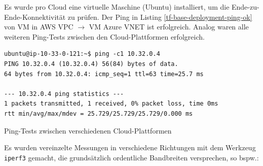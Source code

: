 Es wurde pro Cloud eine virtuelle Maschine (Ubuntu) installiert, um die Ende-zu-Ende-Konnektivität zu prüfen. Der Ping in Listing \ref{tf-base-deployment-ping-ok} von VM in AWS VPC $\rightarrow$ VM Azure VNET ist erfolgreich. Analog waren alle weiteren Ping-Tests zwischen den Cloud-Plattformen erfolgreich.
\begin{listing}[h]
\begin{verbatim}
ubuntu@ip-10-33-0-121:~$ ping -c1 10.32.0.4
PING 10.32.0.4 (10.32.0.4) 56(84) bytes of data.
64 bytes from 10.32.0.4: icmp_seq=1 ttl=63 time=25.7 ms

--- 10.32.0.4 ping statistics ---
1 packets transmitted, 1 received, 0% packet loss, time 0ms
rtt min/avg/max/mdev = 25.729/25.729/25.729/0.000 ms
\end{verbatim}
\caption{Ping-Tests zwischen verschiedenen Cloud-Plattformen}
\label{tf-base-deployment-ping-ok}
\end{listing}\FloatBarrier
Es wurden vereinzelte Messungen in verschiedene Richtungen mit dem Werkzeug \texttt{iperf3} gemacht, die grundsätzlich \glqq ordentliche\grqq{} Bandbreiten versprechen, so bspw.:

